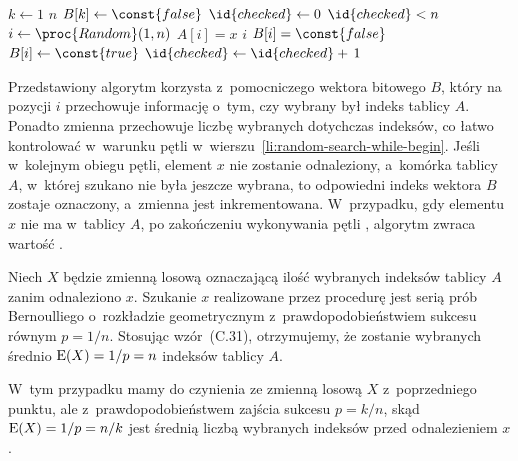 \subproblem %
\begin{codebox}
\li	\For $k\gets1$ \To $n$
\li		\Do
			$B[k]\gets\const{false}$
		\End
\li	$\id{checked}\gets0$
\li	\While $\id{checked}<n$ \label{li:random-search-while-begin}
\li		\Do
			$i\gets\proc{Random}(1,n)$
\li			\If $A[i]=x$
\li				\Then
					\Return $i$
\li				\ElseIf $B[i]=\const{false}$
\li					\Then
						$B[i]\gets\const{true}$
\li						$\id{checked}\gets\id{checked}+\,1$
				\End
		\End
\li	\Return {}
\end{codebox}
Przedstawiony algorytm korzysta z~pomocniczego wektora bitowego $B$, który na pozycji $i$ przechowuje informację o~tym, czy wybrany był  indeks tablicy $A$. Ponadto zmienna  przechowuje liczbę wybranych dotychczas indeksów, co łatwo kontrolować w~warunku pętli  w~wierszu~\ref{li:random-search-while-begin}. Jeśli w~kolejnym obiegu pętli, element $x$ nie zostanie odnaleziony, a~komórka tablicy $A$, w~której szukano nie była jeszcze wybrana, to odpowiedni indeks wektora $B$ zostaje oznaczony, a~zmienna  jest inkrementowana. W~przypadku, gdy elementu $x$ nie ma w~tablicy $A$, po zakończeniu wykonywania pętli , algorytm zwraca wartość .

\subproblem %
Niech $X$ będzie zmienną losową oznaczającą ilość wybranych indeksów tablicy $A$ zanim odnaleziono $x$. Szukanie $x$ realizowane przez procedurę  jest serią prób Bernoulliego o~rozkładzie geometrycznym z~prawdopodobieństwiem sukcesu równym $p=1/n$. Stosując wzór~(C.31), otrzymujemy, że zostanie wybranych średnio $\operatorname{E}(X)=1/p=n$ indeksów tablicy $A$.

\subproblem %
W~tym przypadku mamy do czynienia ze zmienną losową $X$ z~poprzedniego punktu, ale z~prawdopodobieństwem zajścia sukcesu $p=k/n$, skąd $\operatorname{E}(X)=1/p=n/k$ jest średnią liczbą wybranych indeksów przed odnalezieniem $x$.

